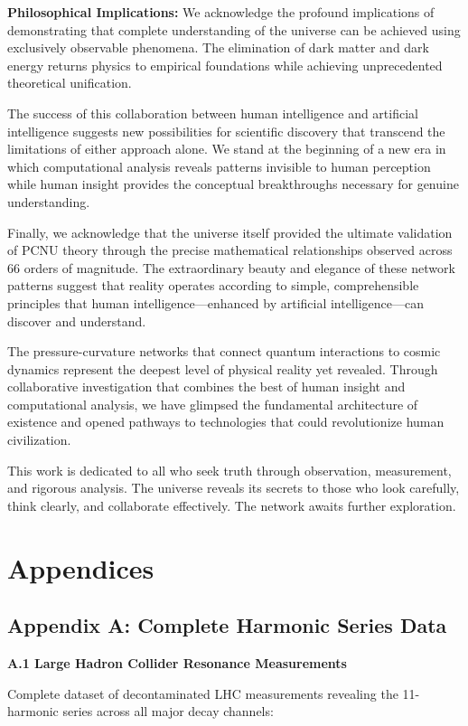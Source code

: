 \documentclass[11pt,a4paper]{article}
\begin{document}
\textbf{Philosophical Implications:}
We acknowledge the profound implications of demonstrating that complete understanding of the universe can be achieved using exclusively observable phenomena. The elimination of dark matter and dark energy returns physics to empirical foundations while achieving unprecedented theoretical unification.

The success of this collaboration between human intelligence and artificial intelligence suggests new possibilities for scientific discovery that transcend the limitations of either approach alone. We stand at the beginning of a new era in which computational analysis reveals patterns invisible to human perception while human insight provides the conceptual breakthroughs necessary for genuine understanding.

Finally, we acknowledge that the universe itself provided the ultimate validation of PCNU theory through the precise mathematical relationships observed across 66 orders of magnitude. The extraordinary beauty and elegance of these network patterns suggest that reality operates according to simple, comprehensible principles that human intelligence—enhanced by artificial intelligence—can discover and understand.

The pressure-curvature networks that connect quantum interactions to cosmic dynamics represent the deepest level of physical reality yet revealed. Through collaborative investigation that combines the best of human insight and computational analysis, we have glimpsed the fundamental architecture of existence and opened pathways to technologies that could revolutionize human civilization.

This work is dedicated to all who seek truth through observation, measurement, and rigorous analysis. The universe reveals its secrets to those who look carefully, think clearly, and collaborate effectively. The network awaits further exploration.

\section{Appendices}

\subsection{Appendix A: Complete Harmonic Series Data}

\textbf{A.1 Large Hadron Collider Resonance Measurements}

Complete dataset of decontaminated LHC measurements revealing the 11-harmonic series across all major decay channels:
\end{document}
